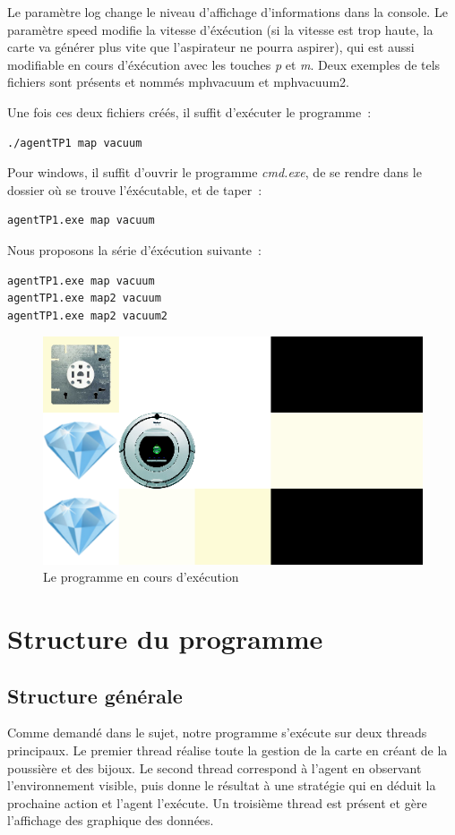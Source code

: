 \documentclass{article}
\begin{document}
Le paramètre log change le niveau d'affichage d'informations dans la console. Le
paramètre speed modifie la vitesse d'éxécution (si la vitesse est trop haute, la carte va générer plus vite que l'aspirateur ne pourra aspirer), qui est aussi modifiable en
cours d'éxécution avec les touches \emph{p} et \emph{m}. Deux exemples de tels
fichiers sont présents et nommés mph{vacuum} et mph{vacuum2}.


Une fois ces deux fichiers créés, il suffit d'exécuter le programme~:
\begin{verbatim}
./agentTP1 map vacuum
\end{verbatim}

Pour windows, il suffit d'ouvrir le programme \emph{cmd.exe}, de se rendre dans le dossier où se trouve l'éxécutable, et de taper~:
\begin{verbatim}
agentTP1.exe map vacuum
\end{verbatim}

Nous proposons la série d'éxécution suivante~:
\begin{verbatim}
agentTP1.exe map vacuum
agentTP1.exe map2 vacuum
agentTP1.exe map2 vacuum2
\end{verbatim}

\begin{figure}[h]
	\begin{center}
		\includegraphics[scale=0.4]{execution}
		\caption{Le programme en cours d'exécution}
		\label{fig:Execution}
	\end{center}
\end{figure}

\section{Structure du programme}
\subsection{Structure générale}
Comme demandé dans le sujet, notre programme s'exécute sur deux threads
principaux. Le premier thread réalise toute la gestion de la carte en créant de
la poussière et des bijoux. Le second thread correspond à l'agent en observant
l'environnement visible, puis donne le résultat à une stratégie qui en déduit la
prochaine action et l'agent l'exécute. Un troisième thread est présent et gère
l'affichage des graphique des données.
\end{document}
